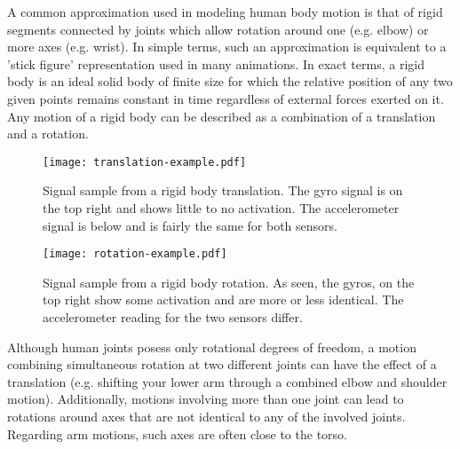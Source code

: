A common approximation used in modeling human body motion is
that of rigid segments connected by joints which allow rotation
around  one (e.g. elbow) or more axes (e.g. wrist). 
In simple terms, such an approximation is equivalent to a 'stick figure' 
representation used in many animations. In exact terms, a rigid body is 
an ideal solid body of finite size for which the relative position of any 
two given points remains constant in time regardless of external forces exerted
on it. Any motion of a rigid body can be described as a combination
of a translation and a rotation.

\begin{figure*}[t]
\centering   
\texttt{[image: translation-example.pdf]}
\caption[Rigid body translation example]{Signal sample from a rigid body translation. The gyro signal
is on the top right and shows little to no activation. The accelerometer
signal is below and is fairly the same for both sensors.}
\label{fig:trans-example}
\end{figure*}

\begin{figure*}[t]
\centering   
\texttt{[image: rotation-example.pdf]}
\caption[Rigid body rotation example]{Signal sample from a rigid body rotation. As seen, the gyros, on the
top right show some activation and are more or less identical.
The accelerometer reading for the two sensors differ.}
\label{fig:rot-example}
\end{figure*}

Although human joints posess only rotational degrees of freedom, 
a motion combining simultaneous rotation at two different joints can 
have the effect of a translation (e.g. shifting your lower arm through 
a combined elbow and shoulder motion). Additionally, motions involving more than
one joint can lead to rotations around axes that are not identical
to any of the involved joints. Regarding arm motions, such axes are 
often close to the torso.

